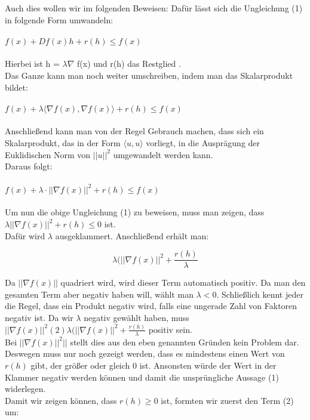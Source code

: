 Auch dies wollen wir im folgenden Beweisen:
Dafür lässt sich die Ungleichung (1) in folgende Form umwandeln: \\ \\
$f(x) + Df(x)h + r(h) \leq f(x)$  \\ \\
Hierbei ist h = $\lambda \nabla$ f(x) und r(h) das Restglied %
. \\
Das Ganze kann man noch weiter umschreiben, indem man das Skalarprodukt bildet: \\ \\
$f(x) + \lambda \langle \nabla f(x), \nabla f(x) \rangle + r(h) \leq f(x)$ \\ \\
Anschließend kann man von der Regel Gebrauch machen, dass sich ein Skalarprodukt, das in der Form $\langle u,u \rangle$ vorliegt, in die Ausprägung der Euklidischen Norm von $||u||^2$ umgewandelt werden kann. \\
Daraus folgt: \\ \\
$f(x) + \lambda \cdot || \nabla f(x)||^2 + r(h) \leq f(x)$ \\ \\
Um nun die obige Ungleichung (1) zu beweisen, muss man zeigen, dass \\ $\lambda ||\nabla f(x)||^2 + r(h) \leq 0$ ist.\\
Dafür wird $\lambda$ ausgeklammert. Anschließend erhält man:

\begin{equation} \lambda (||\nabla f(x)||^2 + \frac{r(h)}{\lambda} \end{equation}

Da $||\nabla f(x)||$ quadriert wird, wird dieser Term automatisch positiv. Da man den gesamten Term aber negativ haben will, wählt man $\lambda < 0.$ Schließlich kennt jeder die Regel, dass ein Produkt negativ wird, falls eine ungerade Zahl von Faktoren negativ ist. Da wir $\lambda$ negativ gewählt haben, muss \\ $||\nabla f(x)||^2$$(2) \lambda (||\nabla f(x)||^2 + \frac{r(h)}{\lambda}$ positiv sein.\\
Bei $||\nabla f(x)||^2||$ stellt dies aus den eben genannten Gr\"unden kein Problem dar. Deswegen muss nur noch gezeigt werden, dass es mindestens einen Wert von $r(h)$ gibt, der gr\"oßer oder gleich 0 ist. Ansonsten würde der Wert in der Klammer negativ werden k\"onnen und damit die unspr\"ungliche Aussage (1) widerlegen.\\
Damit wir zeigen k\"onnen, dass $r(h) \geq 0$ ist, formten wir zuerst den Term (2) um:\\

